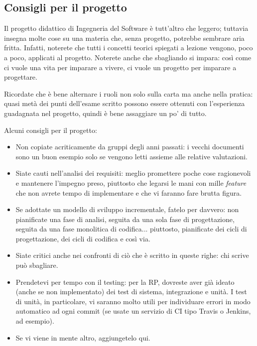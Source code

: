\documentclass[a4paper]{article}
\begin{document}
		
	\subsection{Consigli per il progetto}

		
Il progetto didattico di Ingegneria del Software è tutt'altro che leggero; tuttavia insegna molte cose su una materia che, senza progetto, potrebbe sembrare aria fritta. Infatti, noterete che tutti i concetti teorici spiegati a lezione vengono, poco a poco, applicati al progetto. Noterete anche che sbagliando si impara: così come ci vuole una vita per imparare a vivere, ci vuole un progetto per imparare a progettare.
		
Ricordate che è bene alternare i ruoli non solo sulla carta ma anche nella pratica: quasi metà dei punti dell'esame scritto possono essere ottenuti con l'esperienza guadagnata nel progetto, quindi è bene assaggiare un po' di tutto.
		
Alcuni consigli per il progetto:
		
	\begin{itemize}
		
			
	\item Non copiate acriticamente da gruppi degli anni passati: i vecchi documenti sono un buon esempio solo se vengono letti assieme alle relative valutazioni.
			
	\item Siate cauti nell'analisi dei requisiti: meglio promettere poche cose ragionevoli e mantenere l'impegno preso, piuttosto che legarsi le mani con mille \emph{feature} che non avrete tempo di implementare e che vi faranno fare brutta figura.
			
	\item Se adottate un modello di sviluppo incrementale, fatelo per davvero: non pianificate una fase di analisi, seguita da una sola fase di progettazione, seguita da una fase monolitica di codifica... piuttosto, pianificate dei cicli di progettazione, dei cicli di codifica e così via.
			
	\item Siate critici anche nei confronti di ciò che è scritto in queste righe: chi scrive può sbagliare.
			
	\item Prendetevi per tempo con il testing: per la RP, dovreste aver già ideato (anche se non implementato) dei test di sistema, integrazione e unità. I test di unità, in particolare, vi saranno molto utili per individuare errori in modo automatico ad ogni commit (se usate un servizio di CI tipo Travis o Jenkins, ad esempio).
			
	\item Se vi viene in mente altro, aggiungetelo qui.
		
	\end{itemize}
\end{document}

